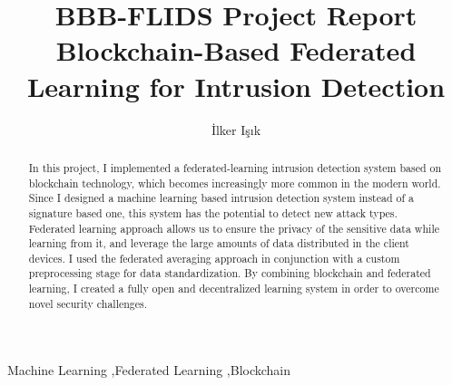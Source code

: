 \documentclass[final,1p]{elsarticle}
\begin{document}
\begin{frontmatter}



\title{
BBB-FLIDS Project Report\\
{\small Blockchain-Based Federated Learning for Intrusion Detection}
}


\author{İlker Işık}


\begin{abstract}
In this project, I implemented a federated-learning intrusion detection system based on blockchain technology, which becomes increasingly more common in the modern world.
Since I designed a machine learning based intrusion detection system instead of a signature based one, this system has the potential to detect new attack types.
Federated learning approach allows us to ensure the privacy of the sensitive data while learning from it, and leverage the large amounts of data distributed in the client devices.
I used the federated averaging approach in conjunction with a custom preprocessing stage for data standardization.
By combining blockchain and federated learning, I created a fully open and decentralized learning system in order to overcome novel security challenges.
\end{abstract}


\begin{keyword}
Machine Learning \sep Federated Learning \sep Blockchain
\end{keyword}

\end{frontmatter}
\end{document}
